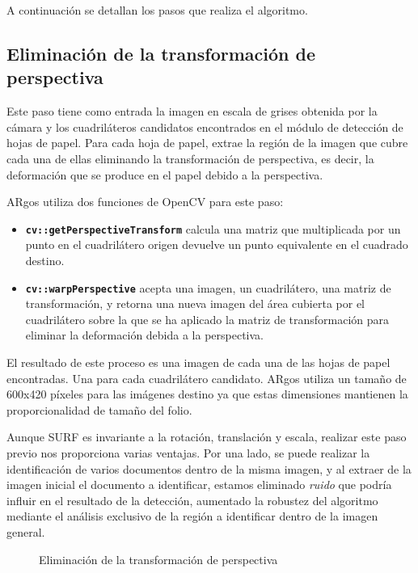 A continuación se detallan los pasos que realiza el algoritmo.

\subsection{Eliminación de la transformación de perspectiva}
Este paso tiene como entrada la imagen en escala de grises obtenida
por la cámara y los cuadriláteros candidatos encontrados en el módulo
de detección de hojas de papel. Para cada hoja de papel, extrae la
región de la imagen que cubre cada una de ellas eliminando la
transformación de perspectiva, es decir, la deformación que se produce
en el papel debido a la perspectiva.

ARgos utiliza dos funciones de OpenCV para este paso:

\begin{itemize}
\item \textbf{\texttt{cv::getPerspectiveTransform}} calcula
  una matriz que multiplicada por un punto en el cuadrilátero origen
  devuelve un punto equivalente en el cuadrado destino.

\item \textbf{\texttt{cv::warpPerspective}} acepta una
  imagen, un cuadrilátero, una matriz de transformación, y retorna una
  nueva imagen del área cubierta por el cuadrilátero sobre la que se
  ha aplicado la matriz de transformación para eliminar la deformación
  debida a la perspectiva.
\end{itemize}

El resultado de este proceso es una imagen de cada una de las hojas de
papel encontradas. Una para cada cuadrilátero candidato. ARgos utiliza
un tamaño de 600x420 píxeles para las imágenes destino ya que estas dimensiones mantienen la proporcionalidad de tamaño del folio.

Aunque SURF es invariante a la rotación, translación y
escala, realizar este paso previo nos proporciona varias ventajas. Por
una lado, se puede realizar la identificación de varios documentos
dentro de la misma imagen, y al extraer de la imagen inicial el
documento a identificar, estamos eliminado \emph{ruido} que podría
influir en el resultado de la detección, aumentado la robustez del algoritmo mediante
el análisis exclusivo de la región a identificar dentro de la imagen
general.

\begin{figure}[htbp]
\centering
{}
\caption{Eliminación de la transformación de perspectiva} \label{fig:warp}
\end{figure}



